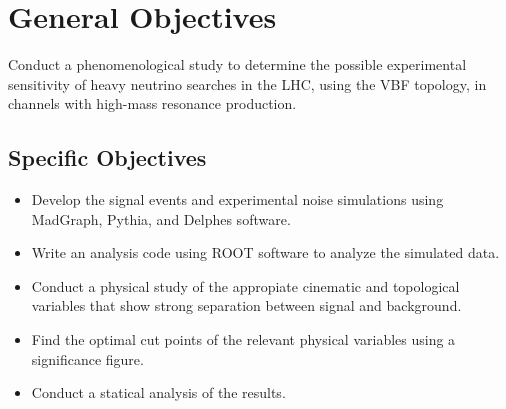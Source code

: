\section{General Objectives}

Conduct a phenomenological study to determine the possible experimental sensitivity of heavy neutrino searches in the LHC, using the VBF topology, in channels with high-mass resonance production.

\subsection{Specific Objectives}

\begin{itemize}
	\item Develop the signal events and experimental noise simulations using MadGraph, Pythia, and Delphes software.
	\item Write an analysis code using ROOT software to analyze the simulated data.
	\item Conduct a physical study of the appropiate cinematic and topological variables that show strong separation between signal and background.
	\item Find the optimal cut points of the relevant physical variables using a significance figure.
    \item Conduct a statical analysis of the results.
\end{itemize}
